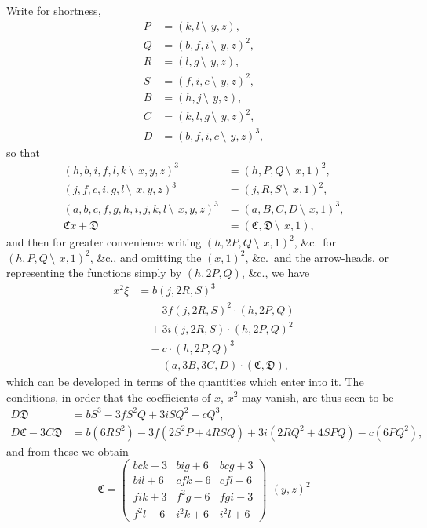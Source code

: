 \documentclass[12pt,a4paper]{article}
\begin{document}
Write for shortness,
\begin{align*}
P &= (k, l\,\setminus\!\!\:\, y, z),\\
Q &= (b, f, i\,\setminus\!\!\:\, y, z)^2,\\
R &= (l, g\,\setminus\!\!\:\, y, z),\\
S &= (f, i, c\,\setminus\!\!\:\, y, z)^2,\\
B &= (h, j\,\setminus\!\!\:\, y, z),\\
C &= (k, l, g\,\setminus\!\!\:\, y, z)^2,\\
D &= (b, f, i, c\,\setminus\!\!\:\, y, z)^3,
\end{align*}
so that
\begin{align*}
(h, b, i, f, l, k\,\setminus\!\!\:\, x, y, z)^3 &= (h, P, Q\,\setminus\!\!\:\, x, 1)^2,\\
(j, f, c, i, g, l\,\setminus\!\!\:\, x, y, z)^3 &= (j, R, S\,\setminus\!\!\:\, x, 1)^2,\\
(a, b, c, f, g, h, i, j, k, l\,\setminus\!\!\:\, x, y, z)^3 &= (a, B, C, D\,\setminus\!\!\:\, x, 1)^3,\\
\mathfrak{C}x + \mathfrak{D} &= (\mathfrak{C}, \mathfrak{D}\,\setminus\!\!\:\, x, 1),
\end{align*}
and then for greater convenience writing $(h, 2P, Q\,\setminus\!\!\:\, x, 1)^2$, \&c.\ for $(h, P, Q\,\setminus\!\!\:\, x, 1)^2$, \&c., and omitting the $(x, 1)^2$, \&c.\ and the arrow-heads, or representing the functions simply by $(h, 2P, Q)$, \&c., we have
\begin{align*}
x^2\xi &= b(j, 2R, S)^3\\
&\quad - 3f(j, 2R, S)^2 \cdot (h, 2P, Q)\\
&\quad + 3i(j, 2R, S) \cdot (h, 2P, Q)^2\\
&\quad - c \cdot (h, 2P, Q)^3\\
&\quad - (a, 3B, 3C, D) \cdot (\mathfrak{C}, \mathfrak{D}),
\end{align*}
which can be developed in terms of the quantities which enter into it. The conditions, in order that the coefficients of $x$, $x^2$ may vanish, are thus seen to be
\begin{align*}
D\mathfrak{D} &= bS^3 - 3fS^2Q + 3iSQ^2 - cQ^3,\\
D\mathfrak{C} - 3C\mathfrak{D} &= b(6RS^2) - 3f(2S^2P + 4RSQ) + 3i(2RQ^2 + 4SPQ) - c(6PQ^2),
\end{align*}
and from these we obtain
\[
\mathfrak{C} =
\begin{pmatrix}
bck - 3 & big + 6 & bcg + 3 \\
bil + 6 & cfk - 6 & cfl - 6 \\
fik + 3 & f^2g - 6 & fgi - 3 \\
f^2l - 6 & i^2k + 6 & i^2l + 6
\end{pmatrix}
\!\!\:\, (y, z)^2
\]
\end{document}
